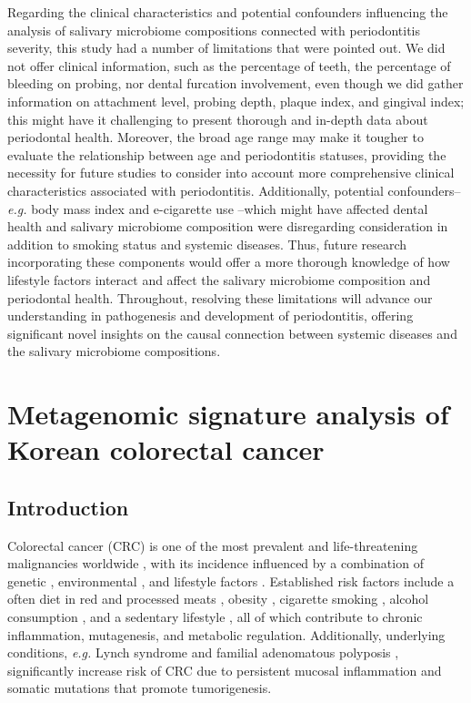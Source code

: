 \documentclass[11pt, a4paper, onecolumn, oneside]{report}
\begin{document}
            Regarding the clinical characteristics and potential confounders influencing the analysis of salivary microbiome compositions connected with periodontitis severity, this study had a number of limitations that were pointed out. We did not offer clinical information, such as the percentage of teeth, the percentage of bleeding on probing, nor dental furcation involvement, even though we did gather information on attachment level, probing depth, plaque index, and gingival index; this might have it challenging to present thorough and in-depth data about periodontal health. Moreover, the broad age range may make it tougher to evaluate the relationship between age and periodontitis statuses, providing the necessity for future studies to consider into account more comprehensive clinical characteristics associated with periodontitis. Additionally, potential confounders--\textit{e.g.} body mass index \cite{obesity-1} and e-cigarette use \cite{cigarette-1}--which might have affected dental health and salivary microbiome composition were disregarding consideration in addition to smoking status and systemic diseases. Thus, future research incorporating these components would offer a more thorough knowledge of how lifestyle factors interact and affect the salivary microbiome composition and periodontal health. Throughout, resolving these limitations will advance our understanding in pathogenesis and development of periodontitis, offering significant novel insights on the causal connection between systemic diseases and the salivary microbiome compositions.
        \newpage

    \section{Metagenomic signature analysis of Korean colorectal cancer}
        \label{section:colon}
        \subsection{Introduction}
            Colorectal cancer (CRC) is one of the most prevalent and life-threatening malignancies worldwide \cite{CRC-1, CRC-2, CRC-3}, with its incidence influenced by a combination of genetic \cite{CRC-factor-1, CRC-factor-2}, environmental \cite{CRC-factor-3, CRC-factor-4}, and lifestyle factors \cite{CRC-factor-5, CRC-factor-6, CRC-factor-7, CRC-factor-8}. Established risk factors include a often diet in red and processed meats \cite{CRC-factor-9, CRC-factor-10}, obesity \cite{CRC-factor-11, CRC-factor-12}, cigarette smoking \cite{CRC-factor-5, CRC-factor-6}, alcohol consumption \cite{CRC-factor-7, CRC-factor-8}, and a sedentary lifestyle \cite{CRC-factor-13}, all of which contribute to chronic inflammation, mutagenesis, and metabolic regulation. Additionally, underlying conditions, \textit{e.g.} Lynch syndrome \cite{CRC-disease-3, CRC-disease-4} and familial adenomatous polyposis \cite{CRC-disease-1, CRC-disease-2}, significantly increase risk of CRC due to persistent mucosal inflammation and somatic mutations that promote tumorigenesis.
\end{document}

